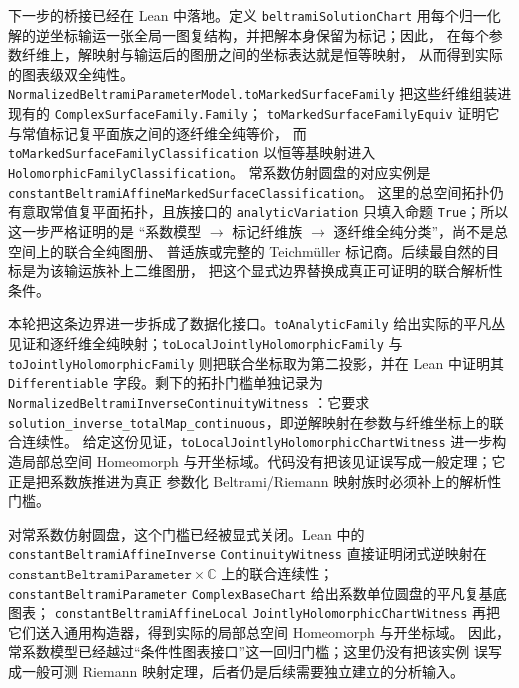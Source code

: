 \documentclass[UTF8,fontset=none,a4paper,11pt]{ctexart}
\begin{document}
下一步的桥接已经在 Lean 中落地。定义
\texttt{beltramiSolutionChart}\linebreak
用每个归一化解的逆坐标输运一张全局一图复结构，并把解本身保留为标记；因此，
在每个参数纤维上，解映射与输运后的图册之间的坐标表达就是恒等映射，
从而得到实际的图表级双全纯性。
\texttt{NormalizedBeltramiParameterModel.toMarkedSurfaceFamily}\linebreak
把这些纤维组装进现有的
\texttt{ComplexSurfaceFamily.Family}；
\texttt{toMarkedSurfaceFamilyEquiv}\linebreak
证明它与常值标记复平面族之间的逐纤维全纯等价，\linebreak
而
\texttt{toMarkedSurfaceFamilyClassification}\linebreak
以恒等基映射进入
\texttt{HolomorphicFamilyClassification}。
常系数仿射圆盘的对应实例是
\texttt{constantBeltramiAffineMarkedSurfaceClassification}。
这里的总空间拓扑仍有意取常值复平面拓扑，且族接口的
\texttt{analyticVariation} 只填入命题 \texttt{True}；所以这一步严格证明的是
“系数模型 \(\to\) 标记纤维族 \(\to\) 逐纤维全纯分类”，尚不是总空间上的联合全纯图册、
普适族或完整的 Teichmüller 标记商。后续最自然的目标是为该输运族补上二维图册，
把这个显式边界替换成真正可证明的联合解析性条件。

本轮把这条边界进一步拆成了数据化接口。\texttt{toAnalyticFamily} 给出实际的平凡丛
见证和逐纤维全纯映射；\texttt{toLocalJointlyHolomorphicFamily} 与
\texttt{toJointlyHolomorphicFamily} 则把联合坐标取为第二投影，并在 Lean 中证明其
\texttt{Differentiable} 字段。剩下的拓扑门槛单独记录为
\texttt{NormalizedBeltramiInverseContinuityWitness}\linebreak
：它要求
\texttt{solution\_inverse\_totalMap\_continuous}，即逆解映射在参数与纤维坐标上的联合连续性。
给定这份见证，\texttt{toLocalJointlyHolomorphicChartWitness} 进一步构造局部总空间
Homeomorph 与开坐标域。代码没有把该见证误写成一般定理；它正是把系数族推进为真正
参数化 Beltrami/Riemann 映射族时必须补上的解析性门槛。

对常系数仿射圆盘，这个门槛已经被显式关闭。Lean 中的\linebreak
\texttt{constantBeltramiAffineInverse}\linebreak
\texttt{ContinuityWitness} 直接证明闭式逆映射在
\(\texttt{constantBeltramiParameter}\times\mathbb C\) 上的联合连续性；
\texttt{constantBeltramiParameter}\linebreak
\texttt{ComplexBaseChart} 给出系数单位圆盘的平凡复基底图表；
\texttt{constantBeltramiAffineLocal}\linebreak
\texttt{JointlyHolomorphicChartWitness} 再把它们送入通用构造器，得到实际的局部总空间
Homeomorph 与开坐标域。
因此，常系数模型已经越过“条件性图表接口”这一回归门槛；这里仍没有把该实例
误写成一般可测 Riemann 映射定理，后者仍是后续需要独立建立的分析输入。
\end{document}
